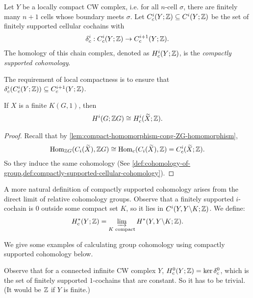 \begin{definition}
    \label{def:compactly-supported-cellular-cohomology}
    Let \(Y\) be a locally compact CW complex, i.e. for all \(n\)-cell \(\sigma\), there are finitely many \(n+1\) cells whose boundary meets \(\sigma\).
    Let \(C_c^i(Y;\Z) \subseteq C^i(Y;\Z)\) be the set of finitely supported cellular cochains with 
    \[ 
        \d^i_c : C_c^i(Y;\Z) \to C_c^{i+1}(Y;\Z) .
    \]
    The homology of this chain complex, denoted as  \(H^i_c(Y;\Z)\), is the \emph{compactly supported cohomology}. 
\end{definition}

\begin{remark}
    The requirement of local compactness is to ensure that \(\d_c^i(C_c^i(Y;\Z)) \subseteq C_c^{i+1}(Y;\Z)\).
\end{remark}

\begin{theorem}
    \label{thm:finite-KG1-compact-cohomology}
    If \(X\) is a finite \(K(G,1)\), then \[ H^i(G;\Z G) \cong H_c^i(\tilde X;\Z) .\]
\end{theorem}
\begin{proof}
    Recall that by \cref{lem:compact-homomorphism-cong-ZG-homomorphism},
    \begin{align*}
          \Hom{ C_i(\tilde X) }{\Z G }{\Z G}  
         \cong \Hom{C_i(\tilde X) }{\Z }{c} 
         = C_c^i(\tilde X;\Z).
    \end{align*} 
    So they induce the same cohomology (See \cref{def:cohomology-of-group,def:compactly-supported-cellular-cohomology}).
\end{proof}

\begin{remark}
    \label{rmk:compact-support-cohomology-as-direct-limit}
    A more natural definition of compactly supported cohomology arises from the direct limit of relative cohomology groups. Observe that a finitely supported \(i\)-cochain is \(0\) outside some compact set \(K\), so it lies in \(C^i(Y,Y\backslash K;\Z)\). We define:
    \[ H_c^*(Y;\Z) = \varinjlim_{K \text{ compact}} H^*(Y,Y\backslash K;\Z) .\]
\end{remark}

We give some examples of calculating group cohomology using compactly supported cohomology below.

Observe that for a connected infinite CW complex \(Y\), \(H_c^0(Y;\Z )= \ker \d^0_c\), which is the set of finitely supported \(1\)-cochains that are constant. So it has to be trivial. (It would be \(\Z\) if \(Y\) is finite.)

